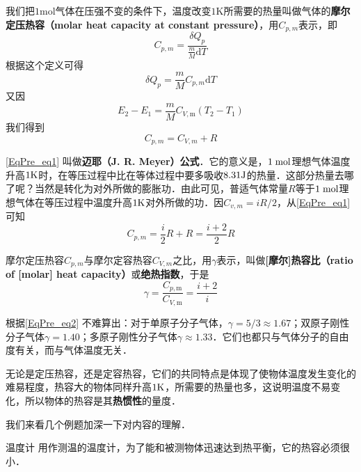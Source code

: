 我们把$1\mathrm{mol}$气体在压强不变的条件下，温度改变$1\mathrm K$所需要的热量叫做气体的\textbf{摩尔定压热容（molar heat capacity at constant pressure）}，用$C_{p,m}$表示，即
\begin{equation}
C_{p, {m}}=\frac{\delta Q_{p}}{\frac{m}{M} \mathrm{d} T}
\end{equation}
根据这个定义可得
\begin{equation}
\delta Q_{p}=\frac{m}{M} C_{p, {m}} \mathrm{d} T
\end{equation}
又因
\begin{equation}
E_{2}-E_{1}=\frac{m}{M} C_{V, \mathrm{m}}\left(T_{2}-T_{1}\right)
\end{equation}
我们得到
\begin{equation} \label{EqPre_eq1}
C_{p, m}=C_{V, m}+R
\end{equation}

\autoref{EqPre_eq1} 叫做\textbf{迈耶（J. R. Meyer）公式}．它的意义是，$1\; \rm mol$理想气体温度升高$1\rm K$时，在等压过程中比在等体过程中要多吸收$8. 31\rm J $的热量．这部分热量去哪了呢？当然是转化为对外所做的膨胀功．由此可见，普适气体常量$R$等于$1\;\rm mol$理想气体在等压过程中温度升高$1\rm K$对外所做的功．因$C_{v, m}=iR/2$，从\autoref{EqPre_eq1} 可知
\begin{equation}
C_{p, {m}}=\frac{i}{2} R+R=\frac{i+2}{2} R
\end{equation}

摩尔定压热容$C_{p,m}$与摩尔定容热容$C_{V,m}$之比，用$\gamma$表示，叫做\textbf{[摩尔]热容比（ratio of [molar] heat capacity）}或\textbf{绝热指数}，于是
\begin{equation} \label{EqPre_eq2}
\gamma=\frac{C_{p, \mathrm{m}}}{C_{V, \mathrm{m}}}=\frac{i+2}{i}
\end{equation}

根据\autoref{EqPre_eq2} 不难算出：对于单原子分子气体，$\gamma=5/3\approx 1.67$；双原子刚性分子气体$\gamma=1.40$；多原子刚性分子气体$\gamma\approx 1. 33 $．它们也都只与气体分子的自由度有关，而与气体温度无关．

无论是定压热容，还是定容热容，它们的共同特点是体现了使物体温度发生变化的难易程度，热容大的物体同样升高$1\rm K$，所需要的热量也多，这说明温度不易变化，所以物体的热容是其\textbf{热惯性}的量度．

我们来看几个例题加深一下对内容的理解．

\begin{example}{温度计}
用作测温的温度计，为了能和被测物体迅速达到热平衡，它的热容必须很小．
\end{example}

